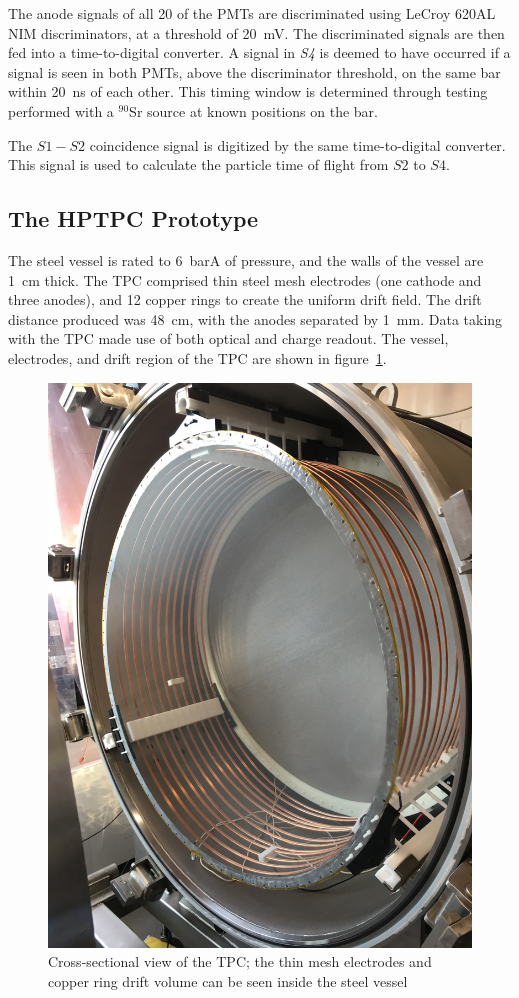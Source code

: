 The anode signals of all 20 of the PMTs are discriminated using LeCroy 620AL NIM discriminators, at a threshold of 20~mV.
The discriminated signals are then fed into a time-to-digital converter. A signal in \textit{S4} is deemed to have occurred if a signal is seen in both PMTs, above the discriminator threshold, on the same bar within 20~ns of each other. 
This timing window is determined through testing performed with a $^{90}$Sr source at known positions on the bar.

The $\mathit{S1-S2}$ coincidence signal is digitized by the same time-to-digital converter. This signal is used to calculate the particle time of flight from $\mathit{S2}$ to $\mathit{S4}$.

\subsection{The HPTPC Prototype}
The steel vessel is rated to 6~barA of pressure, and the walls of the vessel are 1~cm thick.
The TPC comprised thin steel mesh electrodes (one cathode and three anodes), and 12 copper rings to create the uniform drift field.
The drift distance produced was 48~cm, with the anodes separated by 1~mm. Data taking with the TPC made use of both optical and charge readout.
The vessel, electrodes, and drift region of the TPC are shown in figure~\ref{fig:TPC}.

\begin{figure}
  \centering
  \includegraphics[width=0.6\linewidth]{files/Figures/IMG_1194.jpg}
  \caption{Cross-sectional view of the TPC; the thin mesh electrodes and copper ring drift volume can be seen inside the steel vessel}
  \label{fig:TPC}
\end{figure}

